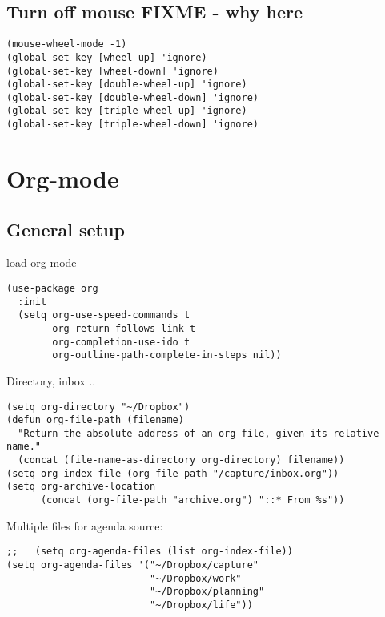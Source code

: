 \documentclass[12pt]{article}
\begin{document}
\subsection{Turn off mouse FIXME - why here}
\label{sec:org36abeb0}

\lstset{language=Lisp,label= ,caption= ,captionpos=b,numbers=none}
\begin{lstlisting}
(mouse-wheel-mode -1)
(global-set-key [wheel-up] 'ignore)
(global-set-key [wheel-down] 'ignore)
(global-set-key [double-wheel-up] 'ignore)
(global-set-key [double-wheel-down] 'ignore)
(global-set-key [triple-wheel-up] 'ignore)
(global-set-key [triple-wheel-down] 'ignore)

\end{lstlisting}

\section{Org-mode}
\label{sec:orgb0708ae}

\subsection{General setup}
\label{sec:orgeee287a}

load org mode

\lstset{language=Lisp,label= ,caption= ,captionpos=b,numbers=none}
\begin{lstlisting}
(use-package org
  :init
  (setq org-use-speed-commands t
        org-return-follows-link t
        org-completion-use-ido t
        org-outline-path-complete-in-steps nil))
\end{lstlisting}

Directory, inbox ..

\lstset{language=Lisp,label= ,caption= ,captionpos=b,numbers=none}
\begin{lstlisting}
(setq org-directory "~/Dropbox")
(defun org-file-path (filename)
  "Return the absolute address of an org file, given its relative name."
  (concat (file-name-as-directory org-directory) filename))
(setq org-index-file (org-file-path "/capture/inbox.org"))
(setq org-archive-location
      (concat (org-file-path "archive.org") "::* From %s"))
\end{lstlisting}

Multiple files for agenda source:

\lstset{language=Lisp,label= ,caption= ,captionpos=b,numbers=none}
\begin{lstlisting}
;;   (setq org-agenda-files (list org-index-file))
(setq org-agenda-files '("~/Dropbox/capture"
                         "~/Dropbox/work"
                         "~/Dropbox/planning"
                         "~/Dropbox/life"))
\end{lstlisting}
\end{document}
